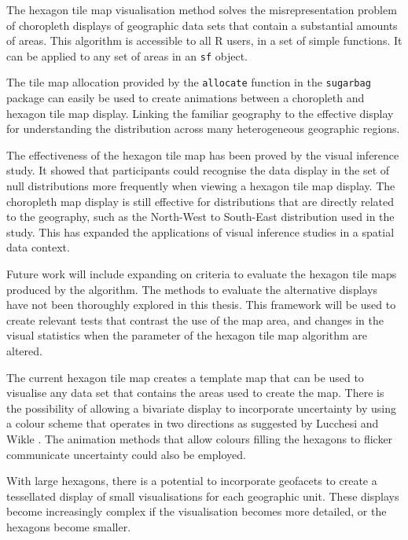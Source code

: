 \documentclass{monashthesis}
\begin{document}
The hexagon tile map visualisation method solves the misrepresentation problem of choropleth displays of geographic data sets that contain a substantial amounts of areas. This algorithm is accessible to all R users, in a set of simple functions. It can be applied to any set of areas in an \texttt{sf} \autocite{sf} object.

The tile map allocation provided by the \texttt{allocate} function in the \texttt{sugarbag} package can easily be used to create animations between a choropleth and hexagon tile map display. Linking the familiar geography to the effective display for understanding the distribution across many heterogeneous geographic regions.

The effectiveness of the hexagon tile map has been proved by the visual inference study. It showed that participants could recognise the data display in the set of null distributions more frequently when viewing a hexagon tile map display. The choropleth map display is still effective for distributions that are directly related to the geography, such as the North-West to South-East distribution used in the study.
This has expanded the applications of visual inference studies in a spatial data context.

Future work will include expanding on criteria to evaluate the hexagon tile maps produced by the algorithm. The methods to evaluate the alternative displays have not been thoroughly explored in this thesis.
This framework will be used to create relevant tests that contrast the use of the map area, and changes in the visual statistics when the parameter of the hexagon tile map algorithm are altered.

The current hexagon tile map creates a template map that can be used to visualise any data set that contains the areas used to create the map.
There is the possibility of allowing a bivariate display to incorporate uncertainty by using a colour scheme that operates in two directions as suggested by Lucchesi and Wikle \autocite{VUADBC}.
The animation methods that allow colours filling the hexagons to flicker communicate uncertainty could also be employed.

With large hexagons, there is a potential to incorporate geofacets \autocite{IGF} to create a tessellated display of small visualisations for each geographic unit. These displays become increasingly complex if the visualisation becomes more detailed, or the hexagons become smaller.
\end{document}
